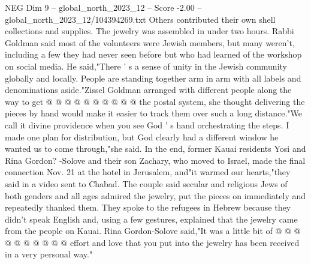 \begin{textsample}{NEG Dim 9 – global\_north\_2023\_12 – Score -2.00 – global\_north\_2023\_12/104394269.txt}
Others contributed their own shell collections and supplies.
The jewelry was assembled in under two hours.
Rabbi Goldman said most of the volunteers were Jewish members, but many weren't, including a few they had never seen before but who had learned of the workshop on social media.
He said,"There ' s a sense of unity in the Jewish community globally and locally.
People are standing together arm in arm with all labels and denominations aside."Zissel Goldman arranged with different people along the way to get @ @ @ @ @ @ @ @ @ @ the postal system, she thought delivering the pieces by hand would make it easier to track them over such a long distance."We call it divine providence when you see God ' s hand orchestrating the steps.
I made one plan for distribution, but God clearly had a different window he wanted us to come through,"she said.
In the end, former Kauai residents Yosi and Rina Gordon? -Solove and their son Zachary, who moved to Israel, made the final connection Nov. 21 at the hotel in Jerusalem, and"it warmed our hearts,"they said in a video sent to Chabad.
The couple said secular and religious Jews of both genders and all ages admired the jewelry, put the pieces on immediately and repeatedly thanked them.
They spoke to the refugees in Hebrew because they didn't speak English and, using a few gestures, explained that the jewelry came from the people on Kauai.
Rina Gordon-Solove said,"It was a little bit of @ @ @ @ @ @ @ @ @ @ effort and love that you put into the jewelry has been received in a very personal way."

\end{textsample}
